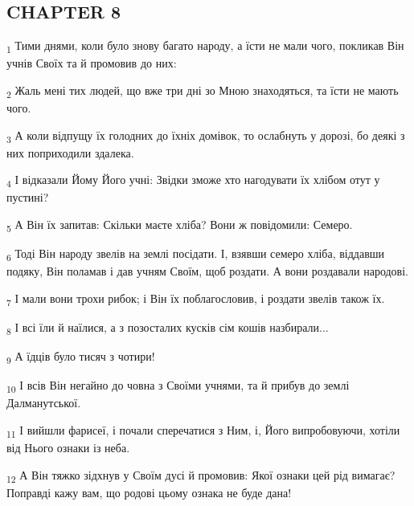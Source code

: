 \subsection{CHAPTER 8}
\begin{tcolorbox}
\textsubscript{1} Тими днями, коли було знову багато народу, а їсти не мали чого, покликав Він учнів Своїх та й промовив до них:
\end{tcolorbox}
\begin{tcolorbox}
\textsubscript{2} Жаль мені тих людей, що вже три дні зо Мною знаходяться, та їсти не мають чого.
\end{tcolorbox}
\begin{tcolorbox}
\textsubscript{3} А коли відпущу їх голодних до їхніх домівок, то ослабнуть у дорозі, бо деякі з них поприходили здалека.
\end{tcolorbox}
\begin{tcolorbox}
\textsubscript{4} І відказали Йому Його учні: Звідки зможе хто нагодувати їх хлібом отут у пустині?
\end{tcolorbox}
\begin{tcolorbox}
\textsubscript{5} А Він їх запитав: Скільки маєте хліба? Вони ж повідомили: Семеро.
\end{tcolorbox}
\begin{tcolorbox}
\textsubscript{6} Тоді Він народу звелів на землі посідати. І, взявши семеро хліба, віддавши подяку, Він поламав і дав учням Своїм, щоб роздати. А вони роздавали народові.
\end{tcolorbox}
\begin{tcolorbox}
\textsubscript{7} І мали вони трохи рибок; і Він їх поблагословив, і роздати звелів також їх.
\end{tcolorbox}
\begin{tcolorbox}
\textsubscript{8} І всі їли й наїлися, а з позосталих кусків сім кошів назбирали...
\end{tcolorbox}
\begin{tcolorbox}
\textsubscript{9} А їдців було тисяч з чотири!
\end{tcolorbox}
\begin{tcolorbox}
\textsubscript{10} І всів Він негайно до човна з Своїми учнями, та й прибув до землі Далманутської.
\end{tcolorbox}
\begin{tcolorbox}
\textsubscript{11} І вийшли фарисеї, і почали сперечатися з Ним, і, Його випробовуючи, хотіли від Нього ознаки із неба.
\end{tcolorbox}
\begin{tcolorbox}
\textsubscript{12} А Він тяжко зідхнув у Своїм дусі й промовив: Якої ознаки цей рід вимагає? Поправді кажу вам, що родові цьому ознака не буде дана!
\end{tcolorbox}
